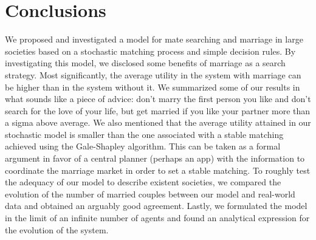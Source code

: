 \documentclass[12pt]{article}
\begin{document}





\section{Conclusions}

We proposed and investigated a model for mate searching and marriage in large societies based on a stochastic matching process and simple decision rules. By investigating this model, we disclosed some benefits of marriage as a search strategy. Most significantly, the average utility in the system with marriage can be higher than in the system without it. We summarized some of our results in what sounds like a piece of advice: don't marry the first person you like and don't search for the love of your life, but get married if you like your partner more than a sigma above average. We also mentioned that the average utility attained in our stochastic model is smaller than the one associated with a stable matching achieved using the Gale-Shapley algorithm. This can be taken as a formal argument in favor of a central planner (perhaps an app) with the information to coordinate the marriage market in order to set a stable matching. To roughly test the adequacy of our model to describe existent societies, we compared the evolution of the number of married couples between our model and real-world data and obtained an arguably good agreement. Lastly, we formulated the model in the limit of an infinite number of agents and found an analytical expression for the evolution of the system. 
\end{document}
